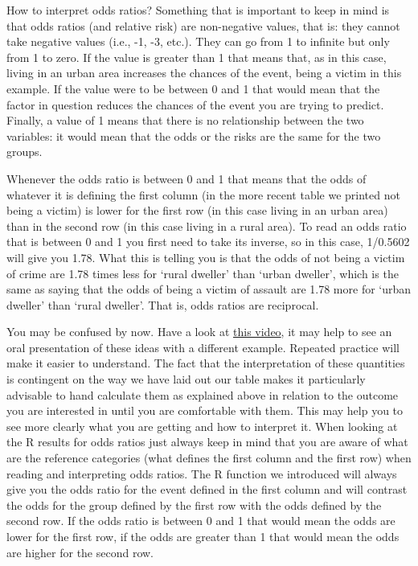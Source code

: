 \documentclass[
]{book}
\begin{document}
How to interpret odds ratios? Something that is important to keep in mind is that odds ratios (and relative risk) are non-negative values, that is: they cannot take negative values (i.e., -1, -3, etc.). They can go from 1 to infinite but only from 1 to zero. If the value is greater than 1 that means that, as in this case, living in an urban area increases the chances of the event, being a victim in this example. If the value were to be between 0 and 1 that would mean that the factor in question reduces the chances of the event you are trying to predict. Finally, a value of 1 means that there is no relationship between the two variables: it would mean that the odds or the risks are the same for the two groups.

Whenever the odds ratio is between 0 and 1 that means that the odds of whatever it is defining the first column (in the more recent table we printed not being a victim) is lower for the first row (in this case living in an urban area) than in the second row (in this case living in a rural area). To read an odds ratio that is between 0 and 1 you first need to take its inverse, so in this case, 1/0.5602 will give you 1.78. What this is telling you is that the odds of not being a victim of crime are 1.78 times less for `rural dweller' than `urban dweller', which is the same as saying that the odds of being a victim of assault are 1.78 more for `urban dweller' than `rural dweller'. That is, odds ratios are reciprocal.

You may be confused by now. Have a look at \href{https://www.youtube.com/watch?v=nFHL54yOniI}{this video}, it may help to see an oral presentation of these ideas with a different example. Repeated practice will make it easier to understand. The fact that the interpretation of these quantities is contingent on the way we have laid out our table makes it particularly advisable to hand calculate them as explained above in relation to the outcome you are interested in until you are comfortable with them. This may help you to see more clearly what you are getting and how to interpret it. When looking at the R results for odds ratios just always keep in mind that you are aware of what are the reference categories (what defines the first column and the first row) when reading and interpreting odds ratios. The R function we introduced will always give you the odds ratio for the event defined in the first column and will contrast the odds for the group defined by the first row with the odds defined by the second row. If the odds ratio is between 0 and 1 that would mean the odds are lower for the first row, if the odds are greater than 1 that would mean the odds are higher for the second row.
\end{document}
